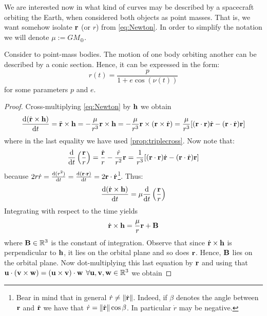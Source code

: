 \documentclass[../main.tex]{subfiles}
\begin{document}
We are interested now in what kind of curves may be described by a spacecraft orbiting the Earth, when considered both objects as point masses. That is, we want somehow isolate $\boldsymbol{\mathrm{r}}$ (or $r$) from \cref{eq:Newton}. In order to simplify the notation we will denote $\mu:=GM_{\oplus}$.
\begin{proposition}
  \label{prop:two-body}
  Consider to point-mass bodies. The motion of one body orbiting another can be described by a conic section. Hence, it can be expressed in the form:
  \begin{equation}
    \label{eq:two-body}
    r(t)=\frac{p}{1+e\cos (\nu(t))}
  \end{equation}
  for some parameters $p$ and $e$.
\end{proposition}
\begin{proof}
  Cross-multiplying \cref{eq:Newton} by $\boldsymbol{\mathrm{h}}$ we obtain
  \begin{equation}\label{eq:rtimesh}
    \dv{(\dot{\boldsymbol{\mathrm{r}}}\times\boldsymbol{\mathrm{h}})}{t}=\ddot{\boldsymbol{\mathrm{r}}}\times\boldsymbol{\mathrm{h}}=-\frac{\mu}{r^3}\boldsymbol{\mathrm{r}}\times\boldsymbol{\mathrm{h}}=-\frac{\mu}{r^3}\boldsymbol{\mathrm{r}}\times(\boldsymbol{\mathrm{r}}\times \dot{\boldsymbol{\mathrm{r}}})=\frac{\mu}{r^3}[(\boldsymbol{\mathrm{r}}\cdot{\boldsymbol{\mathrm{r}}})\dot{\boldsymbol{\mathrm{r}}}-(\boldsymbol{\mathrm{r}}\cdot\dot{\boldsymbol{\mathrm{r}}})\boldsymbol{\mathrm{r}}]
  \end{equation}
  where in the last equality we have used \cref{prop:triplecross}. Now note that:
  \begin{equation}
    \dv{}{t}\left(\frac{\boldsymbol{\mathrm{r}}}{r}\right)=\frac{\dot{\boldsymbol{\mathrm{r}}}}{r}-\frac{\dot{r}}{r^2}\boldsymbol{\mathrm{r}}= \frac{1}{r^3}[(\boldsymbol{\mathrm{r}}\cdot{\boldsymbol{\mathrm{r}}})\dot{\boldsymbol{\mathrm{r}}}-(\boldsymbol{\mathrm{r}}\cdot\dot{\boldsymbol{\mathrm{r}}})\boldsymbol{\mathrm{r}}]
  \end{equation}
  because $2r\dot{r}=\dv{(r^2)}{t}=\dv{(\boldsymbol{\mathrm{r}}\cdot\boldsymbol{\mathrm{r}})}{t}=2\boldsymbol{\mathrm{r}}\cdot\dot{\boldsymbol{\mathrm{r}}}$\footnote{Bear in mind that in general $\dot{r}\ne\left\|\dot{\boldsymbol{\mathrm{r}}}\right\|$. Indeed, if $\beta$ denotes the angle between $\boldsymbol{\mathrm{r}}$ and $\dot{\boldsymbol{\mathrm{r}}}$ we have that $\dot{r}=\left\|\dot{\boldsymbol{\mathrm{r}}}\right\|\cos\beta$. In particular $\dot{r}$ may be negative.}. Thus:
  \begin{equation}
    \dv{(\dot{\boldsymbol{\mathrm{r}}}\times\boldsymbol{\mathrm{h}})}{t}=\mu \dv{}{t}\left(\frac{\boldsymbol{\mathrm{r}}}{r}\right)
  \end{equation}
  Integrating with respect to the time yields
  \begin{equation}\label{eq:rdottimesh}
    \dot{\boldsymbol{\mathrm{r}}}\times \boldsymbol{\mathrm{h}}=\frac{\mu}{r}\boldsymbol{\mathrm{r}}+\boldsymbol{\mathrm{B}}
  \end{equation}
  where $\boldsymbol{\mathrm{B}}\in\mathbb{R}^3$ is the constant of integration. Observe that since $\dot{\boldsymbol{\mathrm{r}}}\times\boldsymbol{\mathrm{h}}$ is perpendicular to $\boldsymbol{\mathrm{h}}$, it lies on the orbital plane and so does $\boldsymbol{\mathrm{r}}$. Hence, $\boldsymbol{\mathrm{B}}$ lies on the orbital plane. Now dot-multiplying this last equation by $\boldsymbol{\mathrm{r}}$ and using that $\boldsymbol{\mathrm{u}}\cdot(\boldsymbol{\mathrm{v}}\times\boldsymbol{\mathrm{w}})=(\boldsymbol{\mathrm{u}}\times\boldsymbol{\mathrm{v}})\cdot\boldsymbol{\mathrm{w}}$ $\forall\boldsymbol{\mathrm{u}},\boldsymbol{\mathrm{v}},\boldsymbol{\mathrm{w}}\in\mathbb{R}^3$ we obtain

\end{proof}
\end{document}
